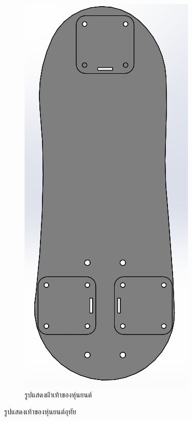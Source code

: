 \begin{figure}[h!]
\begin{subfigure}[b]{0.2\linewidth}
    \includegraphics[width=\linewidth]{chapter4/images/bare_footold.PNG}
    \caption{รูปแสดงฝ่าเท้าของหุ่นยนต์}
  \end{subfigure}
  \caption{รูปแสดงเท้าของหุ่นยนต์อุทัย}
  \label{fig:footold}
\end{figure}

